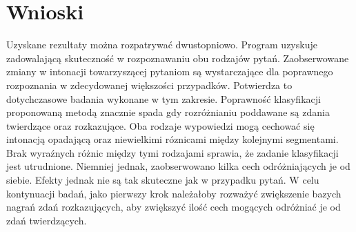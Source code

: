 \documentclass[a4paper,12 pt]{report}
\begin{document}
\section{Wnioski}
Uzyskane rezultaty można rozpatrywać dwustopniowo. Program uzyskuje zadowalającą skuteczność w rozpoznawaniu obu rodzajów pytań. Zaobserwowane zmiany w intonacji towarzyszącej pytaniom są wystarczające dla poprawnego rozpoznania w zdecydowanej większości przypadków. Potwierdza to dotychczasowe badania wykonane w tym zakresie. 
\newline
\newline Poprawność klasyfikacji proponowaną metodą znacznie spada gdy rozróżnianiu poddawane są zdania twierdzące oraz rozkazujące. Oba rodzaje wypowiedzi mogą cechować się intonacją opadającą oraz niewielkimi róznicami między kolejnymi segmentami. Brak wyraźnych różnic między tymi rodzajami sprawia, że zadanie klasyfikacji jest utrudnione. Niemniej jednak, zaobserwowano kilka cech odróżniających je od siebie. Efekty jednak nie są tak skuteczne jak w przypadku pytań.
\newline
\newline
W celu kontynuacji badań, jako pierwszy krok należałoby rozważyć zwiększenie bazych nagrań zdań rozkazujących, aby zwiększyć ilość cech mogących odróżniać je od zdań twierdzących.
\newpage
\end{document}
